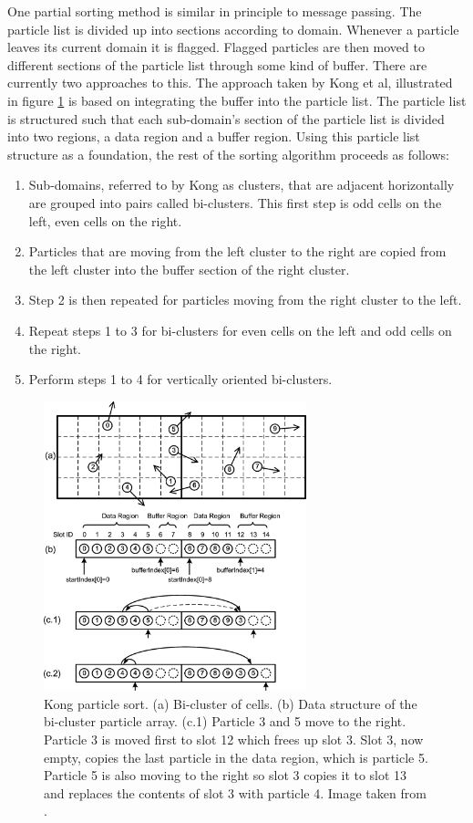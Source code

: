 	One partial sorting method is similar in principle to message passing. The particle list is divided up into sections according to domain. Whenever a particle leaves its current domain it is flagged. Flagged particles are then moved to different sections of the particle list through some kind of buffer. There are currently two approaches to this. The approach taken by Kong et al, illustrated in figure \ref{fig:kong_sort} is based on integrating the buffer into the particle list. The particle list is structured such that each sub-domain's section of the particle list is divided into two regions, a data region and a buffer region. Using this particle list structure as a foundation, the rest of the sorting algorithm proceeds as follows\cite{Kong2011}:

\begin{enumerate}
\singlespace
\item Sub-domains, referred to by Kong as clusters, that are adjacent horizontally are grouped into pairs called bi-clusters. This first step is odd cells on the left, even cells on the right. 
\item Particles that are moving from the left cluster to the right are copied from the left cluster into the buffer section of the right cluster. 
\item Step 2 is then repeated for particles moving from the right cluster to the left. 
\item Repeat steps 1 to 3 for bi-clusters for even cells on the left and odd cells on the right. 
\item Perform steps 1 to 4 for vertically oriented bi-clusters. 
\end{enumerate}


\begin{figure}
\begin{center}
\includegraphics[width=3in]{design/kong_sort.png}
\end{center}
\caption{Kong particle sort. (a) Bi-cluster of cells. (b) Data structure of the bi-cluster particle array. (c.1) Particle 3 and 5 move to the right. Particle 3 is moved first to slot 12 which frees up slot 3. Slot 3, now empty, copies the last particle in the data region, which is particle 5. Particle 5 is also moving to the right so slot 3 copies it to slot 13 and replaces the contents of slot 3 with particle 4. Image taken from \cite{Kong2011}.}
\label{fig:kong_sort}
\end{figure}

